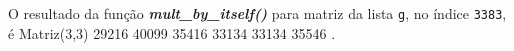\documentclass[12pt,varwidth=16cm,border=1pt]{standalone}
\begin{document}
O resultado da função \textbf{\textit{mult\_by\_itself()}} para matriz da lista \verb+g+, no índice \verb+3383+, é \newline Matriz(3,3)
  29216 40099 
  35416 33134 
  33134 35546 .

\questiomfalse
\end{document}
